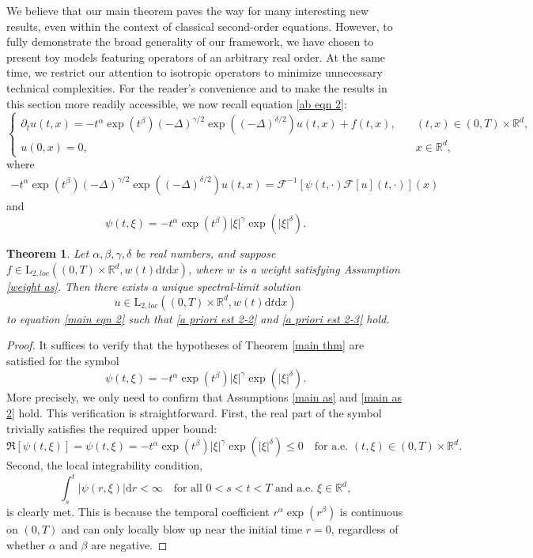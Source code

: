 \documentclass[11pt,reqno]{amsart}
\newtheorem{thm}{Theorem}[section]
\theoremstyle{definition}
\theoremstyle{remark}
\newcommand\bR{\mathbb{R}}
\newcommand\cF{\mathcal{F}}
\numberwithin{equation}{section}
\begin{document}
We believe that our main theorem paves the way for many interesting new results, even within the context of classical second-order equations. However, to fully demonstrate the broad generality of our framework, we have chosen to present toy models featuring operators of an arbitrary real order. At the same time, we restrict our attention to isotropic operators to minimize unnecessary technical complexities. For the reader's convenience and to make the results in this section more readily accessible, we now recall equation \eqref{ab eqn 2}:
\begin{equation}
									\label{main eqn 2}
\begin{cases}
\partial_tu(t,x)= -t^\alpha \exp\left(  t^\beta \right) (-\Delta)^{\gamma/2} \exp\left( (-\Delta)^{\delta/2} \right)  u(t,x)+f(t,x),\quad &(t,x)\in(0,T)\times\mathbb{R}^d,\\
u(0,x)=0,\quad & x\in\mathbb{R}^d,
\end{cases}
\end{equation}
where
\begin{align*}
-t^\alpha \exp\left(  t^\beta \right) (-\Delta)^{\gamma/2} \exp\left( (-\Delta)^{\delta/2} \right)  u(t,x)
=\cF^{-1}\left[\psi(t,\cdot)\cF[u](t,\cdot)\right](x)
\end{align*}
and
$$
\psi(t,\xi)=-t^\alpha \exp\left( t^\beta \right) |\xi|^{\gamma} \exp\left( |\xi|^{\delta} \right). 
$$


\begin{thm}
									\label{main appl 1}
Let $\alpha, \beta, \gamma, \delta$ be real numbers, and suppose $f \in \mathrm{L}_{2,loc}\left( (0,T) \times \bR^d, w(t)\mathrm{d}t\mathrm{d}x \right)$, where $w$ is a weight satisfying Assumption \ref{weight as}. Then there exists a unique spectral-limit solution 
$$
u \in \mathrm{L}_{2,loc}\left( (0,T) \times \bR^d, w(t)\mathrm{d}t\mathrm{d}x \right)
$$
to equation \eqref{main eqn 2} such that \eqref{a priori est 2-2} and \eqref{a priori est 2-3} hold.
\end{thm}

\begin{proof}
It suffices to verify that the hypotheses of Theorem \ref{main thm} are satisfied for the symbol
$$
\psi(t,\xi)=-t^\alpha \exp\left( t^\beta \right) |\xi|^{\gamma} \exp\left( |\xi|^{\delta} \right).
$$
More precisely, we only need to confirm that Assumptions \ref{main as} and \ref{main as 2} hold. This verification is straightforward. First, the real part of the symbol trivially satisfies the required upper bound:
$$
\Re[\psi(t,\xi)] = \psi(t,\xi) = -t^\alpha \exp\left( t^\beta \right) |\xi|^{\gamma} \exp\left( |\xi|^{\delta} \right) \leq 0 \quad \text{for a.e. } (t,\xi) \in (0,T) \times \bR^d.
$$
Second, the local integrability condition,
$$
\int_s^t|\psi(r,\xi)| \mathrm{d}r < \infty \quad \text{for all } 0<s<t<T \text{ and a.e. } \xi \in \bR^d,
$$
is clearly met. 
This is because the temporal coefficient $r^\alpha \exp\left( r^\beta \right)$ is continuous on $(0,T)$ and can only locally blow up near the initial time $r=0$, regardless of whether $\alpha$ and $\beta$ are negative.

\end{proof}
\end{document}
